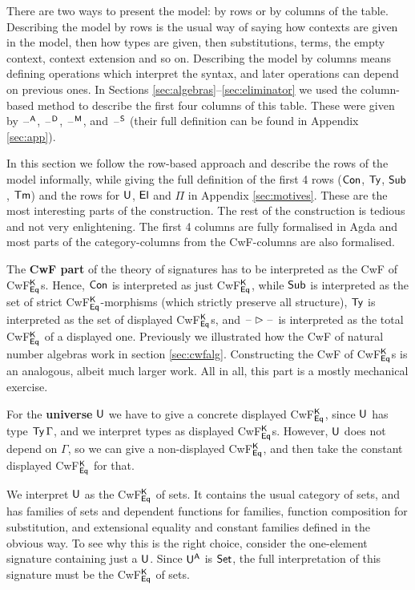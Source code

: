 \documentclass[acmsmall,review]{acmart}\settopmatter{printfolios=true,printccs=false,printacmref=false}
\begin{document}
There are two ways to present the model: by rows or by columns of the
table. Describing the model by rows is the usual way of saying how
contexts are given in the model, then how types are given, then
substitutions, terms, the empty context, context extension and so on.
Describing the model by columns means defining operations which
interpret the syntax, and later operations can depend on previous
ones. In Sections \ref{sec:algebras}--\ref{sec:eliminator} we used the
column-based method to describe the first four columns of this
table. These were given by $\mathord{\hspace{1pt}\text{--}\hspace{1pt}}^{\mathsf{A}}$, $\mathord{\hspace{1pt}\text{--}\hspace{1pt}}^{\mathsf{D}}$, $\mathord{\hspace{1pt}\text{--}\hspace{1pt}}^{\mathsf{M}}$, and
$\mathord{\hspace{1pt}\text{--}\hspace{1pt}}^{\mathsf{S}}$ (their full definition can be found in Appendix
\ref{sec:app}).

In this section we follow the row-based approach and describe the rows
of the model informally, while giving the full definition of the first
4 rows ($\mathsf{Con}$, $\mathsf{Ty}$, $\mathsf{Sub}$, $\mathsf{Tm}$) and the rows for $\mathsf{U}$, $\mathsf{El}$ and
$\Pi$ in Appendix \ref{sec:motives}. These are the most interesting
parts of the construction. The rest of the construction is tedious and
not very enlightening. The first 4 columns are fully formalised in
Agda and most parts of the category-columns from the CwF-columns are
also formalised.

The \textbf{CwF part} of the theory of signatures has to be
interpreted as the CwF of CwF$^{\mathsf{K}}_{\mathsf{Eq}}$s. Hence, $\mathsf{Con}$ is
interpreted as just CwF$^{\mathsf{K}}_{\mathsf{Eq}}$, while $\mathsf{Sub}$ is interpreted as the
set of strict CwF$^{\mathsf{K}}_{\mathsf{Eq}}$-morphisms (which strictly preserve all
structure), $\mathsf{Ty}$ is interpreted as the set of displayed
CwF$^{\mathsf{K}}_{\mathsf{Eq}}$s, and $\mathord{\hspace{1pt}\text{--}\hspace{1pt}}\rhd\mathord{\hspace{1pt}\text{--}\hspace{1pt}}$ is interpreted as the total
CwF$^{\mathsf{K}}_{\mathsf{Eq}}$ of a displayed one. Previously we illustrated how the
CwF of natural number algebras work in section
\ref{sec:cwfalg}. Constructing the CwF of CwF$^{\mathsf{K}}_{\mathsf{Eq}}$s is an
analogous, albeit much larger work. All in all, this part is a mostly
mechanical exercise.

For the \textbf{universe} $\mathsf{U}$ we have to give a concrete displayed
CwF$^{\mathsf{K}}_{\mathsf{Eq}}$, since $\mathsf{U}$ has type $\mathsf{Ty}\,\Gamma$, and we interpret
types as displayed CwF$^{\mathsf{K}}_{\mathsf{Eq}}$s.  However, $\mathsf{U}$ does not depend on
$\Gamma$, so we can give a non-displayed CwF$^{\mathsf{K}}_{\mathsf{Eq}}$, and then take
the constant displayed CwF$^{\mathsf{K}}_{\mathsf{Eq}}$ for that.

We interpret $\mathsf{U}$ as the CwF$^{\mathsf{K}}_{\mathsf{Eq}}$ of sets. It contains the
usual category of sets, and has families of sets and dependent
functions for families, function composition for substitution, and
extensional equality and constant families defined in the obvious way.
To see why this is the right choice, consider the one-element
signature containing just a $\mathsf{U}$. Since $\mathsf{U}^{\mathsf{A}}$ is $\mathsf{Set}$, the full
interpretation of this signature must be the CwF$^{\mathsf{K}}_{\mathsf{Eq}}$ of sets.
\end{document}
